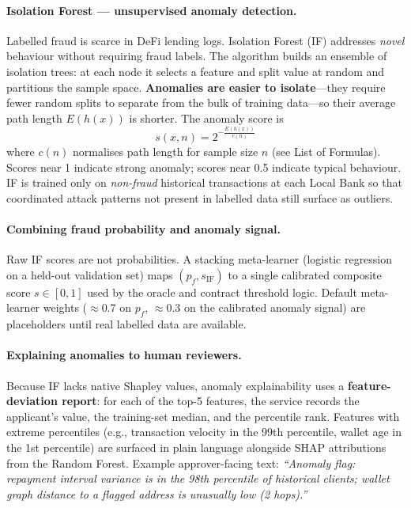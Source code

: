 \documentclass[12pt,a4paper]{report}
\begin{document}
\paragraph{Isolation Forest --- unsupervised anomaly detection.}
Labelled fraud is scarce in DeFi lending logs. Isolation Forest (IF) addresses \textit{novel} behaviour without requiring fraud labels. The algorithm builds an ensemble of isolation trees: at each node it selects a feature and split value at random and partitions the sample space. \textbf{Anomalies are easier to isolate}---they require fewer random splits to separate from the bulk of training data---so their average path length $E(h(x))$ is shorter. The anomaly score is
\[
s(x,n) = 2^{-\frac{E(h(x))}{c(n)}}
\]
where $c(n)$ normalises path length for sample size $n$ (see List of Formulas). Scores near 1 indicate strong anomaly; scores near 0.5 indicate typical behaviour. IF is trained only on \textit{non-fraud} historical transactions at each Local Bank so that coordinated attack patterns not present in labelled data still surface as outliers.

\paragraph{Combining fraud probability and anomaly signal.}
Raw IF scores are not probabilities. A stacking meta-learner (logistic regression on a held-out validation set) maps $(p_f, s_{\text{IF}})$ to a single calibrated composite score $s \in [0,1]$ used by the oracle and contract threshold logic. Default meta-learner weights ($\approx$0.7 on $p_f$, $\approx$0.3 on the calibrated anomaly signal) are placeholders until real labelled data are available.

\paragraph{Explaining anomalies to human reviewers.}
Because IF lacks native Shapley values, anomaly explainability uses a \textbf{feature-deviation report}: for each of the top-5 features, the service records the applicant's value, the training-set median, and the percentile rank. Features with extreme percentiles (e.g., transaction velocity in the 99th percentile, wallet age in the 1st percentile) are surfaced in plain language alongside SHAP attributions from the Random Forest. Example approver-facing text:
\emph{``Anomaly flag: repayment interval variance is in the 98th percentile of historical clients; wallet graph distance to a flagged address is unusually low (2 hops).''}
\end{document}
